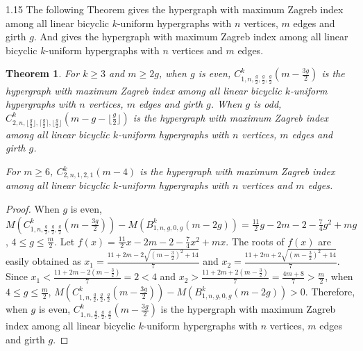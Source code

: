 \documentclass[preprint,12pt]{elsarticle1}
\newtheorem{thm}{Theorem}[section]
\numberwithin{equation}{section}
\begin{document}
\begin{spacing}{1.15}
The following Theorem gives the hypergraph with maximum Zagreb index among all linear bicyclic $k$-uniform hypergraphs with $n$ vertices, $m$ edges and girth $g$. And gives the hypergraph with maximum Zagreb index among all linear bicyclic $k$-uniform hypergraphs with $n$ vertices and $m$ edges.
\begin{thm}
For $k\geq3$ and $m\geq 2g$, when $g$ is even, $C_{1,n,\frac{g}{2},\frac{g}{2},\frac{g}{2}}^{k}(m-\frac{3g}{2})$ is the hypergraph with maximum Zagreb index among all linear bicyclic $k$-uniform hypergraphs with $n$ vertices, $m$ edges and girth $g$.
When $g$ is odd, $C_{2,n,\lfloor\frac{g}{2}\rfloor,\lceil\frac{g}{2}\rceil,\lfloor\frac{g}{2}\rfloor}^{k}(m-g-\lfloor\frac{g}{2}\rfloor)$ is the hypergraph with maximum Zagreb index among all linear bicyclic $k$-uniform hypergraphs with $n$ vertices, $m$ edges and girth $g$.

For $m\geq 6$, $C_{2,n,1,2,1}^{k}(m-4)$ is the hypergraph with maximum Zagreb index among all linear bicyclic $k$-uniform hypergraphs with $n$ vertices and $m$ edges.
\end{thm}
\begin{proof}
When $g$ is even,
$M(C_{1,n,\frac{g}{2},\frac{g}{2},\frac{g}{2}}^{k}(m-\frac{3g}{2}))-M(B_{1,n,g,0,g}^{k}(m-2g))=\frac{11}{2}g-2m-2-\frac{7}{4}g^{2}+mg$, $4\leq g\leq \frac{m}{2}$.
Let $f(x)=\frac{11}{2}x-2m-2-\frac{7}{4}x^{2}+mx$. The roots of $f(x)$ are easily obtained as $x_{1}=\frac{11+2m-2\sqrt{(m-\frac{3}{2})^{2}+14}}{7}$ and $x_{2}=\frac{11+2m+2\sqrt{(m-\frac{3}{2})^{2}+14}}{7}$. Since
$x_{1}<\frac{11+2m-2(m-\frac{3}{2})}{7}=2<4$ and $x_{2}>\frac{11+2m+2(m-\frac{3}{2})}{7}=\frac{4m+8}{7}>\frac{m}{2}$, when $4\leq g\leq \frac{m}{2}$, $M(C_{1,n,\frac{g}{2},\frac{g}{2},\frac{g}{2}}^{k}(m-\frac{3g}{2}))-M(B_{1,n,g,0,g}^{k}(m-2g))>0.$
Therefore, when $g$ is even, $C_{1,n,\frac{g}{2},\frac{g}{2},\frac{g}{2}}^{k}(m-\frac{3g}{2})$ is the hypergraph with maximum Zagreb index among all linear bicyclic $k$-uniform hypergraphs with $n$ vertices, $m$ edges and girth $g$.


\end{proof}
\end{spacing}
\end{document}
